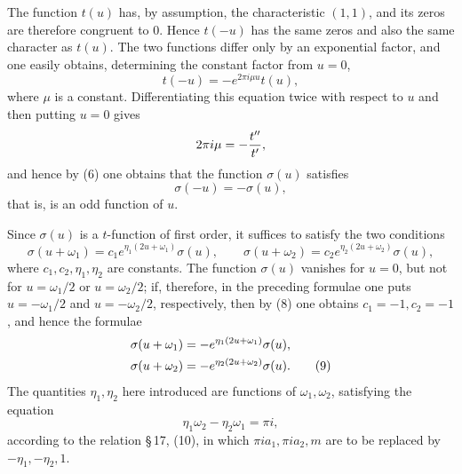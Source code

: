 \documentclass[11pt]{article}
\begin{document}
The function $t(u)$ has, by assumption, the characteristic $(1,1)$, and its zeros are therefore congruent to $0$. Hence $t(-u)$ has the same zeros and also the same character as $t(u)$. The two functions differ only by an exponential factor, and one easily obtains, determining the constant factor from $u=0$,
\[
t(-u)=-e^{2\pi i\mu u}t(u),
\]
where $\mu$ is a constant. Differentiating this equation twice with respect to $u$ and then putting $u=0$ gives
\[
2\pi i\mu=-{t''\over t'},
\]
and hence by (6) one obtains that the function $\sigma(u)$ satisfies
\begin{equation}
\sigma(-u)=-\sigma(u), \tag{8}
\end{equation}
that is, is an odd function of $u$.

Since $\sigma(u)$ is a $t$-function of first order, it suffices to satisfy the two conditions
\[
\sigma(u+\omega_1)=c_1e^{\eta_1(2u+
\omega_1)}\sigma(u),
\qquad
\sigma(u+\omega_2)=c_2e^{\eta_2(2u+\omega_2)}\sigma(u),
\]
where $c_1,c_2,\eta_1,\eta_2$ are constants. The function $\sigma(u)$ vanishes for $u=0$, but not for $u=\omega_1/2$ or $u=\omega_2/2$; if, therefore, in the preceding formulae one puts $u=-\omega_1/2$ and $u=-\omega_2/2$, respectively, then by (8) one obtains $c_1=-1,c_2=-1$, and hence the formulae
\begin{align}
\sigma(u+\omega_1)&=-e^{\eta_1(2u+\omega_1)}\sigma(u),\notag\\
\sigma(u+\omega_2)&=-e^{\eta_2(2u+\omega_2)}\sigma(u). \tag{9}
\end{align}
The quantities $\eta_1,\eta_2$ here introduced are functions of $\omega_1,
\omega_2$, satisfying the equation
\begin{equation}
\eta_1\omega_2-\eta_2\omega_1=\pi i, \tag{10}
\end{equation}
according to the relation \S\,17, (10), in which $\pi i a_1,\pi i a_2,m$ are to be replaced by $-\eta_1,-\eta_2,1$.
\end{document}
